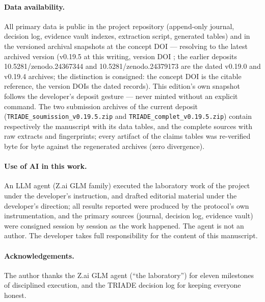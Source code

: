 \documentclass[11pt,a4paper]{article}
\newcommand{\code}[1]{\texttt{\small #1}}
\begin{document}
\paragraph{Data availability.} All primary data is public in the project
repository (append-only journal, decision log, evidence vault indexes,
extraction script, generated tables) and in the versioned archival
snapshots at the concept DOI \doiConcept{} --- resolving to the latest
archived version (v0.19.5 at this writing, version DOI
\doiVersionCourante{}; the earlier deposits 10.5281/zenodo.24367344
and 10.5281/zenodo.24379173 are the dated v0.19.0 and v0.19.4
archives; the distinction is consigned: the concept DOI is the
citable reference, the version DOIs the dated records). This
edition's own snapshot follows the developer's deposit gesture ---
never minted without an explicit command. The two submission
archives of the current deposit (\code{TRIADE\_soumission\_v0.19.5.zip}
and \code{TRIADE\_complet\_v0.19.5.zip}) contain respectively the
manuscript with its data tables, and the complete sources with raw
extracts and fingerprints; every artifact of the claims tables was
re-verified byte for byte against the regenerated archives (zero
divergence).

\paragraph{Use of AI in this work.} An LLM agent (Z.ai GLM family)
executed the laboratory work of the project under the developer's
instruction, and drafted editorial material under the developer's
direction; all results reported were produced by the protocol's own
instrumentation, and the primary sources (journal, decision log,
evidence vault) were consigned session by session as the work happened.
The agent is not an author. The developer takes full responsibility for
the content of this manuscript.

\paragraph{Acknowledgements.} The author thanks the Z.ai GLM agent
(``the laboratory'') for eleven milestones of disciplined execution, and
the TRIADE decision log for keeping everyone honest.


\end{document}
